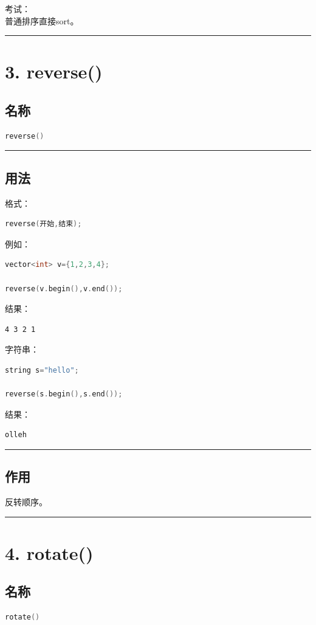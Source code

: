 \documentclass[9pt,twocolumn]{extarticle}
\begin{document}
考试：\\
普通排序直接sort。

\noindent\rule{\linewidth}{0.4pt}

\section{3. reverse()}

\subsection{名称}
\begin{lstlisting}[language=C++]
reverse()
\end{lstlisting}

\noindent\rule{\linewidth}{0.4pt}

\subsection{用法}
格式：
\begin{lstlisting}[language=C++]
reverse(开始,结束);
\end{lstlisting}
例如：
\begin{lstlisting}[language=C++]
vector<int> v={1,2,3,4};

reverse(v.begin(),v.end());
\end{lstlisting}
结果：
\begin{lstlisting}
4 3 2 1
\end{lstlisting}

字符串：
\begin{lstlisting}[language=C++]
string s="hello";

reverse(s.begin(),s.end());
\end{lstlisting}
结果：
\begin{lstlisting}
olleh
\end{lstlisting}

\noindent\rule{\linewidth}{0.4pt}

\subsection{作用}
反转顺序。

\noindent\rule{\linewidth}{0.4pt}

\section{4. rotate()}

\subsection{名称}
\begin{lstlisting}[language=C++]
rotate()
\end{lstlisting}
\end{document}
